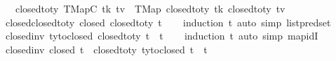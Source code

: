 \begin{isabellebody}
\ {\isacharbar}{\kern0pt}\ \ {\isachardoublequoteopen}closed{\isacharunderscore}{\kern0pt}to{\isacharunderscore}{\kern0pt}ty\ {\isacharparenleft}{\kern0pt}TMapC\ tk\ tv{\isacharparenright}{\kern0pt}\ {\isacharequal}{\kern0pt}\ TMap\ {\isacharparenleft}{\kern0pt}closed{\isacharunderscore}{\kern0pt}to{\isacharunderscore}{\kern0pt}ty\ tk{\isacharparenright}{\kern0pt}\ {\isacharparenleft}{\kern0pt}closed{\isacharunderscore}{\kern0pt}to{\isacharunderscore}{\kern0pt}ty\ tv{\isacharparenright}{\kern0pt}{\isachardoublequoteclose}\isanewline
\isanewline
{}\isamarkupfalse%
\ closed{\isacharunderscore}{\kern0pt}closed{\isacharunderscore}{\kern0pt}to{\isacharunderscore}{\kern0pt}ty{\isacharcolon}{\kern0pt}\ {\isachardoublequoteopen}closed\ {\isacharparenleft}{\kern0pt}closed{\isacharunderscore}{\kern0pt}to{\isacharunderscore}{\kern0pt}ty\ t{\isacharparenright}{\kern0pt}{\isachardoublequoteclose}\isanewline
%
\isadelimproof
\ \ %
\endisadelimproof
%
\isatagproof
{}\isamarkupfalse%
\ {\isacharparenleft}{\kern0pt}induction\ t{\isacharparenright}{\kern0pt}\ {\isacharparenleft}{\kern0pt}auto\ simp{\isacharcolon}{\kern0pt}\ list{\isachardot}{\kern0pt}pred{\isacharunderscore}{\kern0pt}set{\isacharparenright}{\kern0pt}%
\endisatagproof
{\isafoldproof}%
%
\isadelimproof
\isanewline
%
\endisadelimproof
\isanewline
{}\isamarkupfalse%
\ closed{\isacharunderscore}{\kern0pt}inv{}{\isacharcolon}{\kern0pt}\ {\isachardoublequoteopen}ty{\isacharunderscore}{\kern0pt}to{\isacharunderscore}{\kern0pt}closed\ {\isacharparenleft}{\kern0pt}closed{\isacharunderscore}{\kern0pt}to{\isacharunderscore}{\kern0pt}ty\ t{\isacharparenright}{\kern0pt}\ {\isacharequal}{\kern0pt}\ t{\isachardoublequoteclose}\isanewline
%
\isadelimproof
\ \ %
\endisadelimproof
%
\isatagproof
{}\isamarkupfalse%
\ {\isacharparenleft}{\kern0pt}induction\ t{\isacharparenright}{\kern0pt}\ {\isacharparenleft}{\kern0pt}auto\ simp{\isacharcolon}{\kern0pt}\ map{\isacharunderscore}{\kern0pt}idI{\isacharparenright}{\kern0pt}%
\endisatagproof
{\isafoldproof}%
%
\isadelimproof
\isanewline
%
\endisadelimproof
\isanewline
{}\isamarkupfalse%
\ closed{\isacharunderscore}{\kern0pt}inv{}{\isacharcolon}{\kern0pt}\ {\isachardoublequoteopen}closed\ t\ {\isasymLongrightarrow}\ closed{\isacharunderscore}{\kern0pt}to{\isacharunderscore}{\kern0pt}ty\ {\isacharparenleft}{\kern0pt}ty{\isacharunderscore}{\kern0pt}to{\isacharunderscore}{\kern0pt}closed\ t{\isacharparenright}{\kern0pt}\ {\isacharequal}{\kern0pt}\ t{\isachardoublequoteclose}\isanewline

\end{isabellebody}
